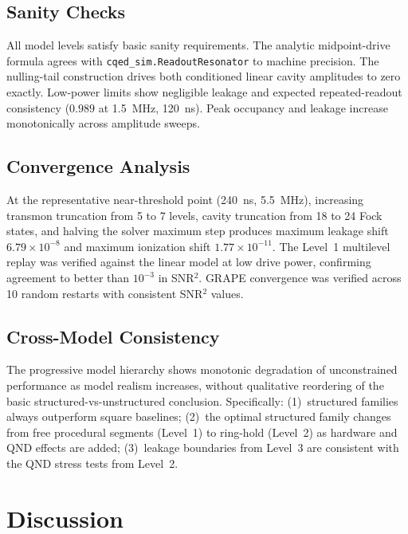 \documentclass[aps,pra,twocolumn,reprint,amsmath,amssymb]{revtex4-2}
\begin{document}
\subsection{Sanity Checks}
All model levels satisfy basic sanity requirements. The analytic midpoint-drive formula agrees with \texttt{cqed\_sim.ReadoutResonator} to machine precision. The nulling-tail construction drives both conditioned linear cavity amplitudes to zero exactly. Low-power limits show negligible leakage and expected repeated-readout consistency ($0.989$ at \SI{1.5}{MHz}, \SI{120}{ns}). Peak occupancy and leakage increase monotonically across amplitude sweeps.

\subsection{Convergence Analysis}
At the representative near-threshold point (\SI{240}{ns}, \SI{5.5}{MHz}), increasing transmon truncation from 5 to 7 levels, cavity truncation from 18 to 24 Fock states, and halving the solver maximum step produces maximum leakage shift $6.79\times 10^{-8}$ and maximum ionization shift $1.77\times 10^{-11}$. The Level~1 multilevel replay was verified against the linear model at low drive power, confirming agreement to better than $10^{-3}$ in SNR$^2$. GRAPE convergence was verified across 10 random restarts with consistent SNR$^2$ values.

\subsection{Cross-Model Consistency}
The progressive model hierarchy shows monotonic degradation of unconstrained performance as model realism increases, without qualitative reordering of the basic structured-vs-unstructured conclusion. Specifically: (1)~structured families always outperform square baselines; (2)~the optimal structured family changes from free procedural segments (Level~1) to ring-hold (Level~2) as hardware and QND effects are added; (3)~leakage boundaries from Level~3 are consistent with the QND stress tests from Level~2.

\section{Discussion}
\end{document}
